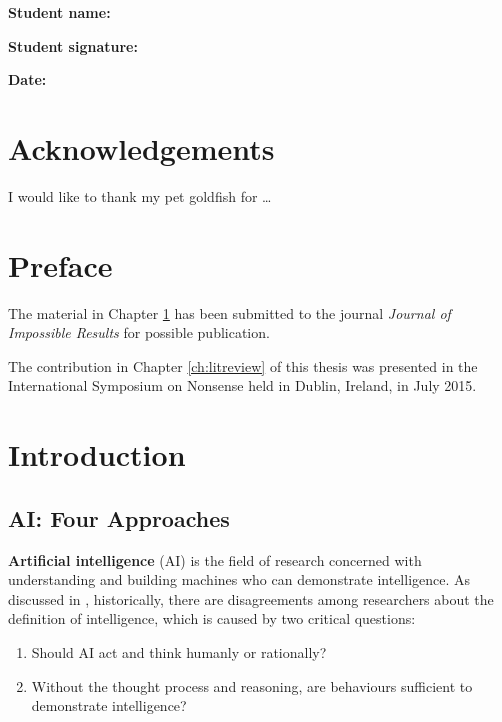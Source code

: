 \documentclass{monashthesis}
\begin{document}
\textbf{Student name:} \authorname

\textbf{Student signature:}

\textbf{Date:}

\hypertarget{acknowledgements}{%
\chapter*{Acknowledgements}\label{acknowledgements}}

I would like to thank my pet goldfish for \dots

\hypertarget{preface}{%
\chapter*{Preface}\label{preface}}

The material in Chapter \ref{ch:intro} has been submitted to the journal \emph{Journal of Impossible Results} for possible publication.

The contribution in Chapter \ref{ch:litreview} of this thesis was presented in the International Symposium on Nonsense held in Dublin, Ireland, in July 2015.

\clearpage{}\setcounter{page}{0}

\hypertarget{ch:intro}{%
\chapter{Introduction}\label{ch:intro}}

\hypertarget{ai-four-approaches}{%
\section{AI: Four Approaches}\label{ai-four-approaches}}

\textbf{Artificial intelligence} (AI) is the field of research concerned with understanding and building machines who can demonstrate intelligence. As discussed in \textcite{russell_artificial_2002}, historically, there are disagreements among researchers about the definition of intelligence, which is caused by two critical questions:

\begin{enumerate}
\def\labelenumi{\arabic{enumi}.}
\tightlist
\item
  Should AI act and think humanly or rationally?
\item
  Without the thought process and reasoning, are behaviours sufficient to demonstrate intelligence?
\end{enumerate}
\end{document}
